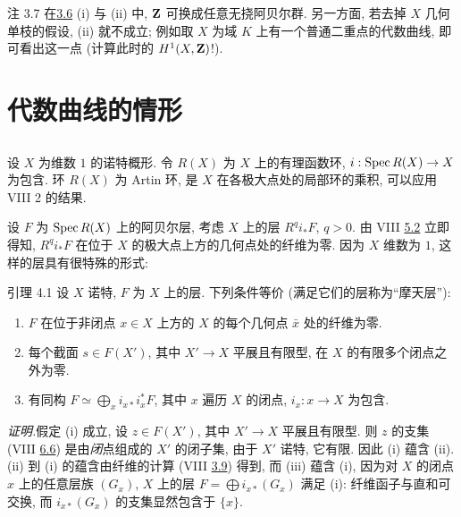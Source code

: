 \begin{enonce*}[remark]{注 3.7}
在\hyperref[IX.prop3.6]{3.6} (i) 与 (ii) 中,
$\mathbf{Z}$ 可换成任意无挠阿贝尔群.
另一方面, 若去掉 $X$ 几何单枝的假设, (ii) 就不成立;
例如取 $X$ 为域 $K$ 上有一个普通二重点的代数曲线, 即可看出这一点
(计算此时的 $H^1(X,\mathbf{Z})$!).
\end{enonce*}




\section{代数曲线的情形}

\setcounter{subsection}{-1}
\subsection{}
设 $X$ 为维数 $1$ 的诺特概形.
令 $R(X)$ 为 $X$ 上的有理函数环, $i:\Spec R(X)\to X$ 为包含.
环 $R(X)$ 为 Artin 环, 是 $X$ 在各极大点处的局部环的乘积,
可以应用 VIII 2 的结果.

设 $F$ 为 $\operatorname{Spec} R(X)$ 上的阿贝尔层,
考虑 $X$ 上的层 $R^qi_*F$, $q>0$.
由 VIII \hyperref[VIII.thm5.2]{5.2} 立即得知,
$R^qi_*F$ 在位于 $X$ 的极大点上方的几何点处的纤维为零.
因为 $X$ 维数为 $1$, 这样的层具有很特殊的形式:

\begin{enonce*}{引理 4.1}
设 $X$ 诺特, $F$ 为 $X$ 上的层.
下列条件等价 (满足它们的层称为“摩天层”):
\begin{enumerate}
\renewcommand{\theenumi}{\roman{enumi}}
\renewcommand{\labelenumi}{(\theenumi)}
\item $F$ 在位于非闭点 $x\in X$ 上方的 $X$ 的每个几何点 $\bar x$ 处的纤维为零.

\item 每个截面 $s\in F(X')$, 其中 $X'\to X$ 平展且有限型,
在 $X$ 的有限多个闭点之外为零.

\item 有同构 $F\simeq\bigoplus_x i_{x*}i_x^*F$,
其中 $x$ 遍历 $X$ 的闭点, $i_x:x\to X$ 为包含.
\end{enumerate}
\end{enonce*}

\emph{证明.}\pageoriginale 假定 (i) 成立,
设 $z\in F(X')$, 其中 $X'\to X$ 平展且有限型.
则 $z$ 的支集 (VIII \hyperref[VIII.subsec6.6]{6.6})
是由\emph{闭}点组成的 $X'$ 的闭子集,
由于 $X'$ 诺特, 它有限.
因此 (i) 蕴含 (ii).
(ii) 到 (i) 的蕴含由纤维的计算 (VIII \hyperref[VIII.prop3.9]{3.9}) 得到,
而 (iii) 蕴含 (i), 因为对 $X$ 的闭点 $x$ 上的任意层族 $(G_x)$,
$X$ 上的层 $F=\bigoplus i_{x*}(G_x)$ 满足 (i):
纤维函子与直和可交换, 而 $i_{x*}(G_x)$ 的支集显然包含于 $\{x\}$.

